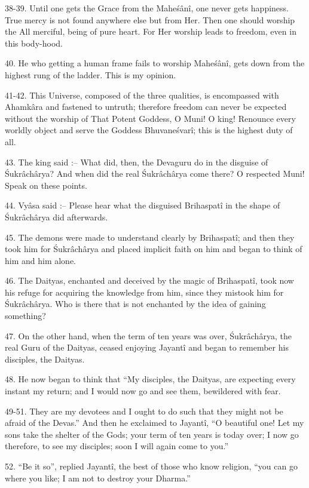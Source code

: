 38-39. Until one gets the Grace from the Mahe\'s\^an\^i, one never gets happiness. True mercy is not found anywhere else but from Her. Then one should worship the All merciful, being of pure heart. For Her worship leads to freedom, even in this body-hood.

40. He who getting a human frame fails to worship Mahe\'s\^an\^i, gets down from the highest rung of the ladder. This is my opinion.

41-42. This Universe, composed of the three qualities, is encompassed with Ahamk\^ara and fastened to untruth; therefore freedom can never be expected without the worship of That Potent Goddess, O Muni! O king! Renounce every worldly object and serve the Goddess Bhuvane\'svar\^i; this is the highest duty of all.

43. The king said :-- What did, then, the Devaguru do in the disguise of \'Sukr\^ach\^arya? And when did the real \'Sukr\^ach\^arya come there? O respected Muni! Speak on these points.

44. Vy\^asa said :-- Please hear what the disguised Brihaspat\^i in the shape of \'Sukr\^ach\^arya did afterwards.

45. The demons were made to understand clearly by Brihaspat\^i; and then they took him for \'Sukr\^ach\^arya and placed implicit faith on him and began to think of him and him alone.

46. The Daityas, enchanted and deceived by the magic of Brihaspat\^i, took now his refuge for acquiring the knowledge from him, since they mistook him for \'Sukr\^ach\^arya. Who is there that is not enchanted by the idea of gaining something?

47. On the other hand, when the term of ten years was over, \'Sukr\^ach\^arya, the real Guru of the Daityas, ceased enjoying Jayant\^i and began to remember his disciples, the Daityas.

48. He now began to think that ``My disciples, the Daityas, are expecting every instant my return; and I would now go and see them, bewildered with fear.

49-51. They are my devotees and I ought to do such that they might not be afraid of the Devas.'' And then he exclaimed to Jayant\^i, ``O beautiful one! Let my sons take the shelter of the Gods; your term of ten years is today over; I now go therefore, to see my disciples; soon I will again come to you.''

52. ``Be it so'', replied Jayant\^i, the best of those who know religion, ``you can go where you like; I am not to destroy your Dharma.''

